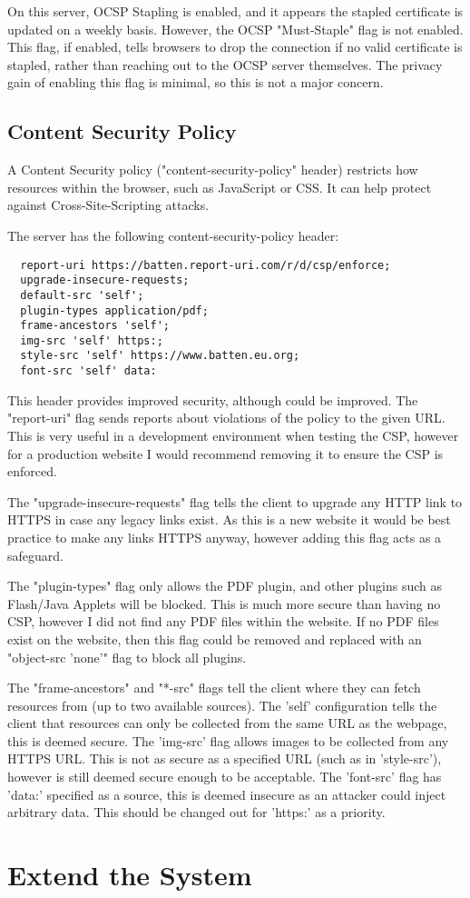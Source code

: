 \documentclass[12pt]{article}
\begin{document}
  On this server, OCSP Stapling is enabled, and it appears the stapled certificate is updated on a weekly basis.
  However, the OCSP "Must-Staple" flag is not enabled.
  This flag, if enabled, tells browsers to drop the connection if no valid certificate is stapled, rather than reaching out to the OCSP server themselves.
  The privacy gain of enabling this flag is minimal, so this is not a major concern.

  \subsection{Content Security Policy}
  A Content Security policy ("content-security-policy" header) restricts how resources within the browser, such as JavaScript or CSS.
  It can help protect against Cross-Site-Scripting attacks.

  The server has the following content-security-policy header:
  \begin{verbatim}
  report-uri https://batten.report-uri.com/r/d/csp/enforce; 
  upgrade-insecure-requests; 
  default-src 'self'; 
  plugin-types application/pdf; 
  frame-ancestors 'self'; 
  img-src 'self' https:; 
  style-src 'self' https://www.batten.eu.org; 
  font-src 'self' data:
  \end{verbatim}

  This header provides improved security, although could be improved.
  The "report-uri" flag sends reports about violations of the policy to the given URL.
  This is very useful in a development environment when testing the CSP, however for a production website I would recommend removing it to ensure the CSP is enforced.

  The "upgrade-insecure-requests" flag tells the client to upgrade any HTTP link to HTTPS in case any legacy links exist.
  As this is a new website it would be best practice to make any links HTTPS anyway, however adding this flag acts as a safeguard.

  The "plugin-types" flag only allows the PDF plugin, and other plugins such as Flash/Java Applets will be blocked.
  This is much more secure than having no CSP, however I did not find any PDF files within the website.
  If no PDF files exist on the website, then this flag could be removed and replaced with an "object-src 'none'" flag to block all plugins.

  The "frame-ancestors" and "*-src" flags tell the client where they can fetch resources from (up to two available sources).
  The 'self' configuration tells the client that resources can only be collected from the same URL as the webpage, this is deemed secure.
  The 'img-src' flag allows images to be collected from any HTTPS URL.
  This is not as secure as a specified URL (such as in 'style-src'), however is still deemed secure enough to be acceptable.
  The 'font-src' flag has 'data:' specified as a source, this is deemed insecure as an attacker could inject arbitrary data.
  This should be changed out for 'https:' as a priority.

  \section{Extend the System}
\end{document}
